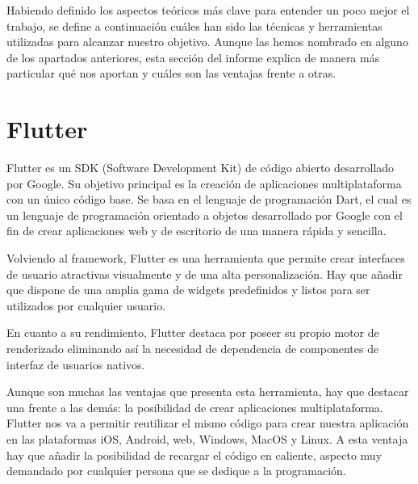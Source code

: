 

	Habiendo definido los aspectos teóricos más clave para entender un poco mejor el trabajo, se define a continuación cuáles han sido las técnicas y herramientas utilizadas para alcanzar nuestro objetivo. Aunque las hemos nombrado en alguno de los apartados anteriores, esta sección del informe explica de manera más particular qué nos aportan y cuáles son las ventajas frente a otras.
	
\section{Flutter}

	Flutter es un SDK (Software Development Kit) de código abierto desarrollado por Google. Su objetivo principal es la creación de aplicaciones multiplataforma con un único código base. Se basa en el lenguaje de programación Dart, el cual es un lenguaje de programación orientado a objetos desarrollado por Google con el fin de crear aplicaciones web y de escritorio de una manera rápida y sencilla.
	
	Volviendo al framework, Flutter es una herramienta que permite crear interfaces de usuario atractivas visualmente y de una alta personalización. Hay que añadir que dispone de una amplia gama de widgets predefinidos y listos para ser utilizados por cualquier usuario.
	
	En cuanto a su rendimiento, Flutter destaca por poseer su propio motor de renderizado eliminando así la necesidad de dependencia de componentes de interfaz de usuarios nativos.
	
	Aunque son muchas las ventajas que presenta esta herramienta, hay que destacar una frente a las demás: la posibilidad de crear aplicaciones multiplataforma. Flutter nos va a permitir reutilizar el mismo código para crear nuestra aplicación en las plataformas iOS, Android, web, Windows, MacOS y Linux. A esta ventaja hay que añadir la posibilidad de recargar el código en caliente, aspecto muy demandado por cualquier persona que se dedique a la programación.
	
